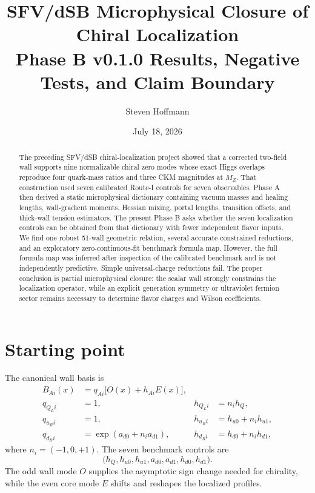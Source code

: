 \documentclass[11pt]{article}
\title{\textbf{SFV/dSB Microphysical Closure of Chiral Localization}\\\large Phase B v0.1.0 Results, Negative Tests, and Claim Boundary}
\author{Steven Hoffmann}
\date{July 18, 2026}
\begin{document}
\maketitle

\begin{abstract}
The preceding SFV/dSB chiral-localization project showed that a corrected two-field wall supports nine normalizable chiral zero modes whose exact Higgs overlaps reproduce four quark-mass ratios and three CKM magnitudes at $M_Z$.  That construction used seven calibrated Route-I controls for seven observables.  Phase A then derived a static microphysical dictionary containing vacuum masses and healing lengths, wall-gradient moments, Hessian mixing, portal lengths, transition offsets, and thick-wall tension estimators.  The present Phase B asks whether the seven localization controls can be obtained from that dictionary with fewer independent flavor inputs.  We find one robust 51-wall geometric relation, several accurate constrained reductions, and an exploratory zero-continuous-fit benchmark formula map.  However, the full formula map was inferred after inspection of the calibrated benchmark and is not independently predictive.  Simple universal-charge reductions fail.  The proper conclusion is partial microphysical closure: the scalar wall strongly constrains the localization operator, while an explicit generation symmetry or ultraviolet fermion sector remains necessary to determine flavor charges and Wilson coefficients.
\end{abstract}

\section{Starting point}
The canonical wall basis is
\begin{align}
B_{Ai}(x)&=q_{Ai}\bigl[O(x)+h_{Ai}E(x)\bigr],\\
q_{Q_Li}&=1,&h_{Q_Li}&=n_i h_Q,\\
q_{u_Ri}&=1,&h_{u_Ri}&=h_{u0}+n_i h_{u1},\\
q_{d_Ri}&=\exp(a_{d0}+n_i a_{d1}),&h_{d_Ri}&=h_{d0}+n_i h_{d1},
\end{align}
where $n_i=(-1,0,+1)$.  The seven benchmark controls are
\begin{equation}
\bigl(h_Q,h_{u0},h_{u1},a_{d0},a_{d1},h_{d0},h_{d1}\bigr).
\end{equation}
The odd wall mode $O$ supplies the asymptotic sign change needed for chirality, while the even core mode $E$ shifts and reshapes the localized profiles.
\end{document}
